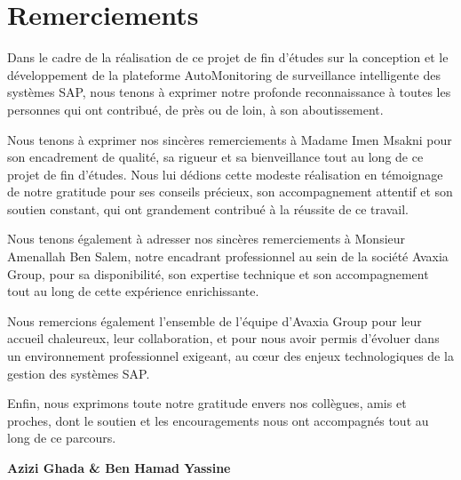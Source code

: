 \chapter*{Remerciements}

Dans le cadre de la réalisation de ce projet de fin d'études sur la conception et le
développement de la plateforme AutoMonitoring de surveillance intelligente des systèmes SAP,
nous tenons à exprimer notre profonde reconnaissance à toutes les personnes qui ont
contribué, de près ou de loin, à son aboutissement.

Nous tenons à exprimer nos sincères remerciements à Madame Imen Msakni  pour son
encadrement de qualité, sa rigueur et sa bienveillance tout au long de ce projet de fin
d'études. Nous lui dédions cette modeste réalisation en témoignage de notre gratitude pour
ses conseils précieux, son accompagnement attentif et son soutien constant, qui ont
grandement contribué à la réussite de ce travail.

Nous tenons également à adresser nos sincères remerciements à Monsieur Amenallah Ben Salem,
notre encadrant professionnel au sein de la société Avaxia Group, pour sa disponibilité,
son expertise technique et son accompagnement tout au long de cette expérience
enrichissante.

Nous remercions également l'ensemble de l'équipe d'Avaxia Group pour leur accueil
chaleureux, leur collaboration, et pour nous avoir permis d'évoluer dans un environnement
professionnel exigeant, au cœur des enjeux technologiques de la gestion des systèmes SAP.

Enfin, nous exprimons toute notre gratitude envers nos collègues, amis et proches, dont le
soutien et les encouragements nous ont accompagnés tout au long de ce parcours.

\vfill

\begin{flushright}
\textbf{Azizi Ghada \& Ben Hamad Yassine}
\end{flushright}
